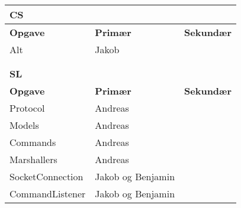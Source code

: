 \begin{table}[h]
\begin{tabular}{lll}
\multicolumn{3}{|l|}{\color{lblue} \textbf{\gls{CS}}}                                                                                                               \\ \hline
\multicolumn{1}{|l|}{\textbf{Opgave}}           & \multicolumn{1}{l|}{\textbf{Primær}}                       & \multicolumn{1}{l|}{\textbf{Sekundær}} \\ \hline
\multicolumn{1}{|l|}{Alt}         & \multicolumn{1}{l|}{Jakob}                                  & \multicolumn{1}{l|}{}                  \\ \hline
& & \\& & \\ \hline 


\multicolumn{3}{|l|}{\color{lblue} \textbf{\gls{SL}}}                                                                                                               \\ \hline
\multicolumn{1}{|l|}{\textbf{Opgave}}           & \multicolumn{1}{l|}{\textbf{Primær}}                       & \multicolumn{1}{l|}{\textbf{Sekundær}} \\ \hline
\multicolumn{1}{|l|}{Protocol}         & \multicolumn{1}{l|}{Andreas}                                  & \multicolumn{1}{l|}{}                  \\ \hline
\multicolumn{1}{|l|}{Models}         & \multicolumn{1}{l|}{Andreas}                                  & \multicolumn{1}{l|}{}                  \\ \hline
\multicolumn{1}{|l|}{Commands}         & \multicolumn{1}{l|}{Andreas}                                  & \multicolumn{1}{l|}{}                  \\ \hline
\multicolumn{1}{|l|}{Marshallers}         & \multicolumn{1}{l|}{Andreas}                                  & \multicolumn{1}{l|}{}                  \\ \hline
\multicolumn{1}{|l|}{SocketConnection}         & \multicolumn{1}{l|}{Jakob og Benjamin}                                  & \multicolumn{1}{l|}{}                  \\ \hline
\multicolumn{1}{|l|}{CommandListener}         & \multicolumn{1}{l|}{Jakob og Benjamin}                                  & \multicolumn{1}{l|}{}                  \\ \hline



\end{tabular}
\end{table}